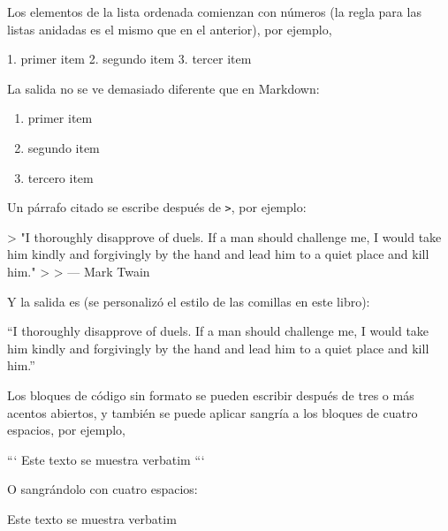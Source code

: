 \documentclass[12pt,]{krantz}
\makeatletter
\newenvironment{Shaded}{\begin{snugshade}}{\end{snugshade}}
\newcommand{\DataTypeTok}[1]{\textcolor[rgb]{0.13,0.29,0.53}{{#1}}}
\newcommand{\BaseNTok}[1]{\textcolor[rgb]{0.00,0.00,0.81}{{#1}}}
\newcommand{\FloatTok}[1]{\textcolor[rgb]{0.00,0.00,0.81}{{#1}}}
\newcommand{\NormalTok}[1]{{#1}}
\providecommand{\tightlist}{%
  \setlength{\itemsep}{0pt}\setlength{\parskip}{0pt}}
\renewenvironment{quote}{\begin{VF}}{\end{VF}}
\newenvironment{kframe}{%
\medskip{}
\setlength{\fboxsep}{.8em}
 \def\at@end@of@kframe{}%
 \ifinner\ifhmode%
  \def\at@end@of@kframe{\end{minipage}}%
  \begin{minipage}{\columnwidth}%
 \fi\fi%
 \def\FrameCommand##1{\hskip\@totalleftmargin \hskip-\fboxsep
 \colorbox{shadecolor}{##1}\hskip-\fboxsep
     \hskip-\linewidth \hskip-\@totalleftmargin \hskip\columnwidth}%
 \MakeFramed {\advance\hsize-\width
   \@totalleftmargin\z@ \linewidth\hsize
   \@setminipage}}%
 {\par\unskip\endMakeFramed%
 \at@end@of@kframe}
\renewenvironment{Shaded}{\begin{kframe}}{\end{kframe}}
\theoremstyle{definition}
\theoremstyle{definition}
\theoremstyle{remark}
\makeatother
\begin{document}
Los elementos de la lista ordenada comienzan con números (la regla para
las listas anidadas es el mismo que en el anterior), por ejemplo,

\begin{Shaded}
\begin{Highlighting}[]
\NormalTok{1. }\FloatTok{primer item}
\FloatTok{2. segundo item}
\FloatTok{3. tercer item}
\end{Highlighting}
\end{Shaded}

La salida no se ve demasiado diferente que en Markdown:

\begin{enumerate}
\def\labelenumi{\arabic{enumi}.}
\tightlist
\item
  primer item
\item
  segundo item
\item
  tercero item
\end{enumerate}

Un párrafo citado se escribe después de \texttt{\textgreater{}}, por
ejemplo:

\begin{Shaded}
\begin{Highlighting}[]
\NormalTok{>}\DataTypeTok{ "I thoroughly disapprove of duels. If a man should challenge me,}
\DataTypeTok{  I would take him kindly and forgivingly by the hand and lead him}
\DataTypeTok{  to a quiet place and kill him."}
\DataTypeTok{>}
\DataTypeTok{> --- Mark Twain}
\end{Highlighting}
\end{Shaded}

Y la salida es (se personalizó el estilo de las comillas en este libro):

\begin{quote}
``I thoroughly disapprove of duels. If a man should challenge me, I
would take him kindly and forgivingly by the hand and lead him to a
quiet place and kill him.''

\end{quote}

Los bloques de código sin formato se pueden escribir después de tres o
más acentos abiertos, y también se puede aplicar sangría a los bloques
de cuatro espacios, por ejemplo,

\begin{Shaded}
\begin{Highlighting}[]
\NormalTok{```}
\NormalTok{Este texto se muestra verbatim}
\NormalTok{```}

\NormalTok{O sangrándolo con cuatro espacios:}

\BaseNTok{    Este texto se muestra verbatim}
\end{Highlighting}
\end{Shaded}
\end{document}
